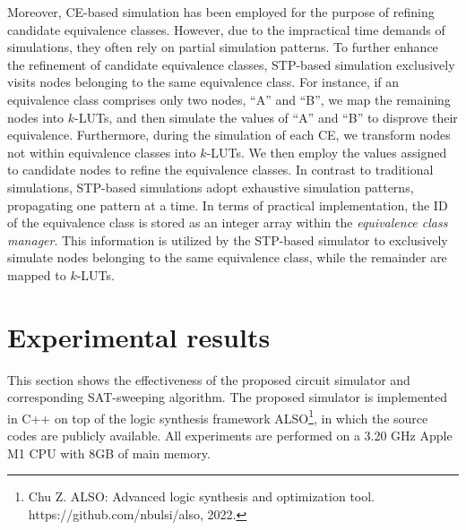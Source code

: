 \documentclass[conference]{IEEEtran}
\begin{document}
Moreover, CE-based simulation has been employed for the purpose of refining candidate equivalence classes. 
However, due to the impractical time demands of simulations, they often rely on partial simulation patterns.
To further enhance the refinement of candidate equivalence classes, STP-based simulation exclusively visits nodes belonging to the same equivalence class. 
For instance, if an equivalence class comprises only two nodes, ``A'' and ``B'', we map the remaining nodes into $k$-LUTs, and then simulate the values of ``A'' and ``B'' to disprove their equivalence.
Furthermore, during the simulation of each CE, we transform nodes not within equivalence classes into $k$-LUTs. 
We then employ the values assigned to candidate nodes to refine the equivalence classes. 
In contrast to traditional simulations, STP-based simulations adopt exhaustive simulation patterns, propagating one pattern at a time.
In terms of practical implementation, the ID of the equivalence class is stored as an integer array within the \emph{equivalence class manager}.
This information is utilized by the STP-based simulator to exclusively simulate nodes belonging to the same equivalence class, while the remainder are mapped to $k$-LUTs.

\vspace{-2mm}
\section{Experimental results}
\label{sec6}
This section shows the effectiveness of the proposed circuit simulator and corresponding SAT-sweeping algorithm.
The proposed simulator is implemented in C++ on top of the logic synthesis framework ALSO\footnote{Chu Z. ALSO: Advanced logic synthesis and optimization tool. https://github.com/nbulsi/also, 2022.}, in which the source codes are publicly available. 
All experiments are performed on a 3.20 GHz Apple M1 CPU with 8GB of main memory.
\end{document}

